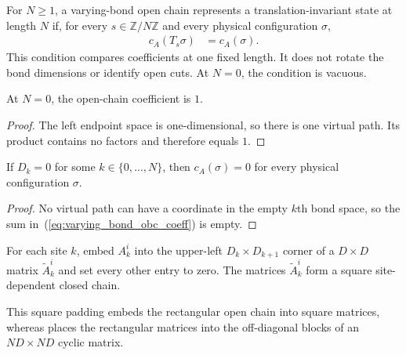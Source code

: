 \begin{definition}
    \label{def:varying_bond_obc_ti}
    \leanok
    For $N\geq1$, a varying-bond open chain represents a
    translation-invariant state at length $N$ if, for every
    $s\in\mathbb Z/N\mathbb Z$ and every physical configuration $\sigma$,
    \begin{align}
        c_A(T_s\sigma) & =c_A(\sigma).
        \label{eq:varying_bond_obc_ti}
    \end{align}
    This condition compares coefficients at one fixed length. It does not
    rotate the bond dimensions or identify open cuts. At $N=0$, the condition
    is vacuous.
\end{definition}

\begin{lemma}
    \label{thm:varying_bond_obc_coeff_zero}
    \leanok
    At $N=0$, the open-chain coefficient is $1$.
\end{lemma}

\begin{proof}
    \leanok
    The left endpoint space is one-dimensional, so there is one virtual path.
    Its product contains no factors and therefore equals $1$.
\end{proof}

\begin{lemma}
    \label{thm:varying_bond_obc_zero_bond}
    \leanok
    If $D_k=0$ for some $k\in\{0,\ldots,N\}$, then
    $c_A(\sigma)=0$ for every physical configuration $\sigma$.
\end{lemma}

\begin{proof}
    \leanok
    No virtual path can have a coordinate in the empty $k$th bond space, so
    the sum in~(\ref{eq:varying_bond_obc_coeff}) is empty.
\end{proof}

\begin{definition}
    \label{def:varying_bond_obc_zero_pad}
    \leanok
    For each site $k$, embed $A_k^i$ into the upper-left
    $D_k\times D_{k+1}$ corner of a $D\times D$ matrix
    $\widetilde A_k^i$ and set every other entry to zero. The matrices
    $\widetilde A_k^i$ form a square site-dependent closed chain.

    This square padding embeds the rectangular open chain into square matrices,
    whereas \cite[Theorem~3]{PerezGarcia2007Matrix} places the rectangular
    matrices into the off-diagonal blocks of an $ND\times ND$ cyclic matrix.
\end{definition}

